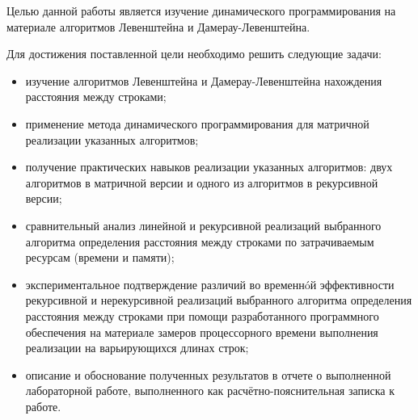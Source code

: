 \Introduction

Целью данной работы является изучение динамического программирования на материале алгоритмов Левенштейна и Дамерау-Левенштейна.

Для достижения поставленной цели необходимо решить следующие задачи:

\begin{itemize}
    \item изучение алгоритмов Левенштейна и Дамерау-Левенштейна нахождения расстояния между строками;
    \item применение метода динамического программирования для матричной реализации указанных алгоритмов;
    \item получение практических навыков реализации указанных алгоритмов: двух алгоритмов в матричной версии и одного из алгоритмов в рекурсивной версии;
    \item сравнительный анализ линейной и рекурсивной реализаций выбранного алгоритма определения расстояния между строками по затрачиваемым ресурсам (времени и памяти);
    \item экспериментальное подтверждение различий во временнóй эффективности рекурсивной и нерекурсивной реализаций выбранного алгоритма определения расстояния между строками при помощи разработанного программного обеспечения на материале замеров процессорного времени выполнения реализации на варьирующихся длинах строк;
    \item описание и обоснование полученных результатов в отчете о выполненной лабораторной работе, выполненного как расчётно-пояснительная записка к работе.
\end{itemize}

